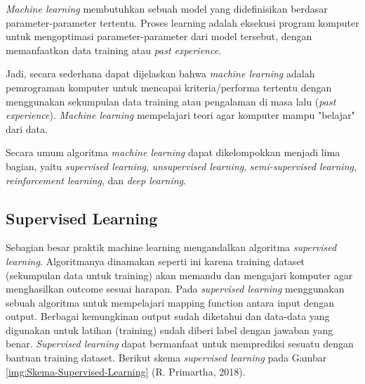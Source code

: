 \textit{Machine learning} membutuhkan sebuah model yang didefinisikan berdasar parameter-parameter tertentu. Proses learning adalah eksekusi program komputer untuk mengoptimasi parameter-parameter dari model tersebut, dengan memanfaatkan data training atau \textit{past experience}.

Jadi, secara sederhana dapat dijelaskan bahwa \textit{machine learning} adalah pemrograman komputer untuk mencapai kriteria/performa tertentu dengan menggunakan sekumpulan data training atau pengalaman di masa lalu (\textit{past experience}). \textit{Machine learning} mempelajari teori agar komputer mampu "belajar" dari data. 

Secara umum algoritma \textit{machine learning} dapat dikelompokkan menjadi lima bagian, yaitu \textit{supervised learning}, \textit{unsupervised learning}, \textit{semi-supervised learning}, \textit{reinforcement learning}, dan \textit{deep learning}.

\subsection{Supervised Learning} 
\hspace{1,2cm}Sebagian besar praktik machine learning mengandalkan algoritma \textit{supervised learning}. Algoritmanya dinamakan seperti ini karena training dataset (sekumpulan data untuk training) akan memandu dan mengajari komputer agar menghasilkan outcome sesuai harapan. Pada \textit{supervised learning} menggunakan sebuah algoritma untuk mempelajari mapping function antara input dengan output. Berbagai kemungkinan output sudah diketahui dan data-data yang digunakan untuk latihan (training) sudah diberi label dengan jawaban yang benar. \textit{Supervised learning} dapat bermanfaat untuk memprediksi sesuatu dengan bantuan training dataset. Berikut skema \textit{supervised learning} pada Gambar \ref{img:Skema-Supervised-Learning} (R. Primartha, 2018).

